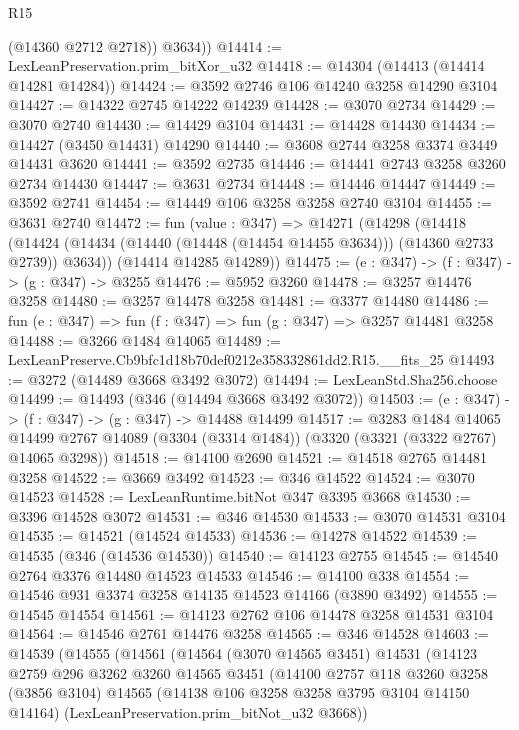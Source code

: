 \begin{lexlean}{R15}
\begin{coremodule}
          (@14360 @2712 @2718))
        @3634))
@14414 := LexLeanPreservation.prim_bitXor_u32
@14418 := @14304 (@14413 (@14414 @14281 @14284))
@14424 := @3592 @2746 @106 @14240 @3258 @14290 @3104
@14427 := @14322 @2745 @14222 @14239
@14428 := @3070 @2734
@14429 := @3070 @2740
@14430 := @14429 @3104
@14431 := @14428 @14430
@14434 := @14427 (@3450 @14431) @14290
@14440 := @3608 @2744 @3258 @3374 @3449 @14431 @3620
@14441 := @3592 @2735
@14446 := @14441 @2743 @3258 @3260 @2734 @14430
@14447 := @3631 @2734
@14448 := @14446 @14447
@14449 := @3592 @2741
@14454 := @14449 @106 @3258 @3258 @2740 @3104
@14455 := @3631 @2740
@14472 := fun (value : @347) =>
  @14271
    (@14298
      (@14418 (@14424 (@14434 (@14440 (@14448 (@14454 @14455 @3634))) (@14360 @2733 @2739)) @3634))
      (@14414 @14285 @14289))
@14475 := (e : @347) -> (f : @347) -> (g : @347) -> @3255
@14476 := @5952 @3260
@14478 := @3257 @14476 @3258
@14480 := @3257 @14478 @3258
@14481 := @3377 @14480
@14486 := fun (e : @347) => fun (f : @347) => fun (g : @347) => @3257 @14481 @3258
@14488 := @3266 @1484 @14065
@14489 := LexLeanPreserve.Cb9bfc1d18b70def0212e358332861dd2.R15.__fits_25
@14493 := @3272 (@14489 @3668 @3492 @3072)
@14494 := LexLeanStd.Sha256.choose
@14499 := @14493 (@346 (@14494 @3668 @3492 @3072))
@14503 := (e : @347) -> (f : @347) -> (g : @347) -> @14488 @14499
@14517 := @3283
    @1484
    @14065
    @14499
    @2767
    @14089
    (@3304 (@3314 @1484))
    (@3320 (@3321 (@3322 @2767) @14065 @3298))
@14518 := @14100 @2690
@14521 := @14518 @2765 @14481 @3258
@14522 := @3669 @3492
@14523 := @346 @14522
@14524 := @3070 @14523
@14528 := LexLeanRuntime.bitNot @347 @3395 @3668
@14530 := @3396 @14528 @3072
@14531 := @346 @14530
@14533 := @3070 @14531 @3104
@14535 := @14521 (@14524 @14533)
@14536 := @14278 @14522
@14539 := @14535 (@346 (@14536 @14530))
@14540 := @14123 @2755
@14545 := @14540 @2764 @3376 @14480 @14523 @14533
@14546 := @14100 @338
@14554 := @14546 @931 @3374 @3258 @14135 @14523 @14166 (@3890 @3492)
@14555 := @14545 @14554
@14561 := @14123 @2762 @106 @14478 @3258 @14531 @3104
@14564 := @14546 @2761 @14476 @3258
@14565 := @346 @14528
@14603 := @14539
    (@14555
      (@14561
        (@14564
          (@3070 @14565 @3451)
          @14531
          (@14123
            @2759
            @296
            @3262
            @3260
            @14565
            @3451
            (@14100
              @2757
              @118
              @3260
              @3258
              (@3856 @3104)
              @14565
              (@14138 @106 @3258 @3258 @3795 @3104 @14150 @14164)
              (LexLeanPreservation.prim_bitNot_u32 @3668))

\end{coremodule}
\end{lexlean}
